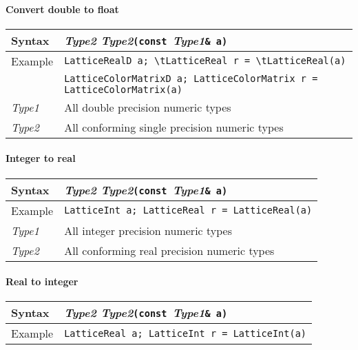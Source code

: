 \documentclass[12pt,letterpaper]{article}
\newcommand{\tLatticeReal}{LatticeReal}
\begin{document}
\paragraph{Convert double to float}
\begin{flushleft}
  \begin{tabular}{|l|l|}
  \hline
  Syntax      & {\it Type2 Type2}{\tt (const }{\it Type1}{\tt \& a)}\\
  \hline
  Example     & \verb|LatticeRealD a; \tLatticeReal r = \tLatticeReal(a)| \\
              & \verb|LatticeColorMatrixD a; LatticeColorMatrix r = LatticeColorMatrix(a)| \\
  \hline
  {\it Type1} & All double precision numeric types \\
  {\it Type2} & All conforming single precision numeric types \\
  \hline
  \end{tabular}
\end{flushleft}

\paragraph{Integer to real}

\begin{flushleft}
  \begin{tabular}{|l|l|}
  \hline
  Syntax      & {\it Type2 Type2}{\tt (const }{\it Type1}{\tt \& a)}\\
  \hline
  Example     & \verb|LatticeInt a; LatticeReal r = LatticeReal(a)| \\
  \hline
  {\it Type1} & All integer precision numeric types \\
  {\it Type2} & All conforming real precision numeric types \\
  \hline
  \end{tabular}
\end{flushleft}

\paragraph{Real to integer}

\begin{flushleft}
  \begin{tabular}{|l|l|}
  \hline
  Syntax      & {\it Type2 Type2}{\tt (const }{\it Type1}{\tt \& a)}\\
  \hline
  Example     & \verb|LatticeReal a; LatticeInt r = LatticeInt(a)| \\
  \hline
  \end{tabular}
\end{flushleft}
\end{document}
